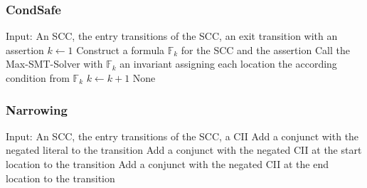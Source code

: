 \documentclass{beamer}
\let\oldReturn\Return
\renewcommand{\Return}{\State\oldReturn}
\begin{document}
\begin{frame}
  \frametitle{CondSafe}
  \begin{algorithmic}[1]
    \State Input: An SCC, the entry transitions of the SCC, an exit transition with an assertion
    \pause
    \State $k \gets 1$
    \pause
    \Repeat
    \State Construct a formula $\mathbb{F}_k$ for the SCC and the assertion
    \pause
    \State Call the Max-SMT-Solver with $\mathbb{F}_k$
    \pause
    \Return an invariant assigning each location the according condition from $\mathbb{F}_k$
    \EndIf
    \pause
    \State $k \gets k + 1$
    \pause
    \Return None
  \end{algorithmic}
\end{frame}

\begin{frame}
  \frametitle{Narrowing}
  \begin{algorithmic}[1]
    \State Input: An SCC, the entry transitions of the SCC, a CII
    \pause
    \pause
    \State Add a conjunct with the negated literal to the transition
    \EndIf
    \EndFor
    \EndFor
    \pause
    \pause
    \State Add a conjunct with the negated CII at the start location to the transition
    \pause
    \State Add a conjunct with the negated CII at the end location to the transition
    \EndFor
\end{algorithmic}

\end{frame}
\end{document}

